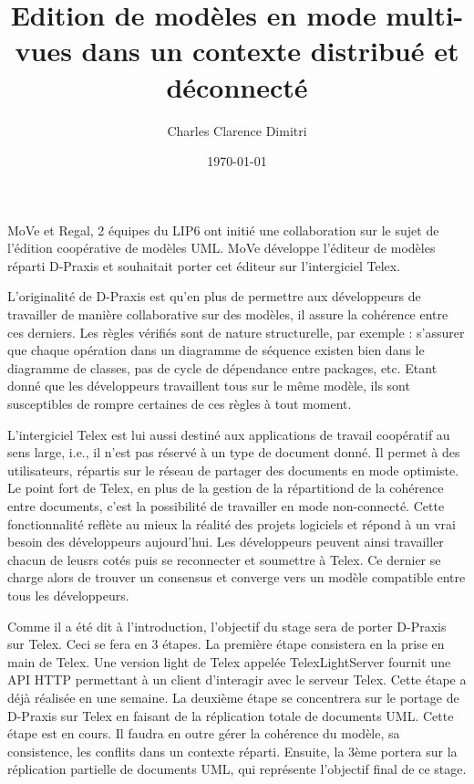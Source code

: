 \documentclass[a4paper,oneside,12pt]{article}
\title{Edition de modèles en mode multi-vues dans un contexte distribué et déconnecté}
\author{Charles Clarence Dimitri}
\date \today
\begin{document}
\maketitle

MoVe et Regal, 2 équipes du LIP6 ont initié une collaboration sur le sujet de l'édition coopérative de modèles UML. MoVe développe l'éditeur de modèles réparti D-Praxis et souhaitait porter cet éditeur sur l'intergiciel Telex.

L'originalité de D-Praxis est qu'en plus de permettre aux développeurs de travailler de manière collaborative sur des modèles, il assure la cohérence entre ces derniers. Les règles vérifiés sont de nature structurelle, par exemple : s'assurer que chaque opération dans un diagramme de séquence existen bien dans le diagramme de classes, pas de cycle de dépendance entre packages, etc. Etant donné que les développeurs travaillent tous sur le même modèle, ils sont susceptibles de rompre certaines de ces règles à tout moment.
 
L'intergiciel Telex est lui aussi destiné aux applications de travail coopératif au sens large, i.e., il n'est pas réservé à un type de document donné. Il permet à des utilisateurs, répartis sur le réseau de partager des documents en mode optimiste. Le point fort de Telex, en plus de la gestion de la répartitiond de la cohérence entre documents, c'est la possibilité de travailler en mode non-connecté. Cette fonctionnalité reflète au mieux la réalité des projets logiciels et répond à un vrai besoin des développeurs aujourd'hui. Les développeurs peuvent ainsi travailler chacun de leusrs cotés puis se reconnecter et soumettre à Telex. Ce dernier se charge alors de trouver un consensus et converge vers un modèle compatible entre tous les développeurs.

Comme il a été dit à l'introduction, l'objectif du stage sera de porter D-Praxis sur Telex. Ceci se fera en 3 étapes. La première étape consistera en la prise en main de Telex. Une version light de Telex appelée TelexLightServer fournit une API HTTP permettant à un client d'interagir avec le serveur Telex. Cette étape a déjà réalisée en une semaine. La deuxième étape se concentrera sur le portage de D-Praxis sur Telex en faisant de la réplication totale de documents UML. Cette étape est en cours. Il faudra en outre gérer la cohérence du modèle, sa consistence, les conflits dans un contexte réparti. Ensuite, la 3ème portera sur la réplication partielle de documents UML, qui représente l'objectif final de ce stage. 
\end{document}
